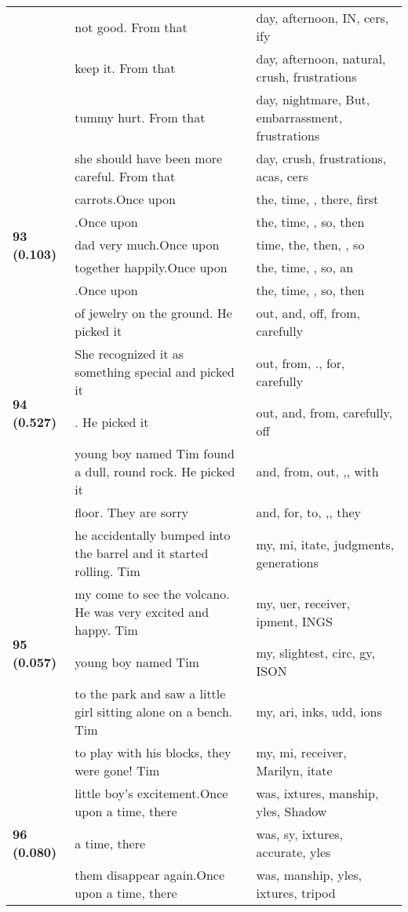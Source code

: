 \documentclass{article}
\begin{document}
\begin{adjustbox}{max width=\textwidth}
\begin{tabular}{p{} p{} p{}}
 & not good. From that & day,  afternoon, IN, cers, ify \\
 & keep it. From that & day,  afternoon,  natural,  crush,  frustrations \\
 & tummy hurt. From that & day,  nightmare, But,  embarrassment,  frustrations \\
 & she should have been more careful. From that & day,  crush,  frustrations, acas, cers \\
\midrule
\multirow{5}{*}{\textbf{93 (0.103)}} & carrots.Once upon & the,  time,  ,  there,  first \\
 & .Once upon & the,  time,  ,  so,  then \\
 & dad very much.Once upon & time,  the,  then,  ,  so \\
 & together happily.Once upon & the,  time,  ,  so,  an \\
 & .Once upon & the,  time,  ,  so,  then \\
\midrule
\multirow{5}{*}{\textbf{94 (0.527)}} & of jewelry on the ground. He picked it & out,  and,  off,  from,  carefully \\
 & She recognized it as something special and picked it & out,  from, .,  for,  carefully \\
 & . He picked it & out,  and,  from,  carefully,  off \\
 & young boy named Tim found a dull, round rock. He picked it & and,  from,  out, ,,  with \\
 & floor. They are sorry & and,  for,  to, ,,  they \\
\midrule
\multirow{5}{*}{\textbf{95 (0.057)}} & he accidentally bumped into the barrel and it started rolling. Tim & my, mi, itate,  judgments,  generations \\
 & my come to see the volcano. He was very excited and happy. Tim & my, uer,  receiver, ipment, INGS \\
 & young boy named Tim & my,  slightest,  circ,  gy, ISON \\
 & to the park and saw a little girl sitting alone on a bench. Tim & my, ari, inks, udd, ions \\
 & to play with his blocks, they were gone! Tim & my, mi,  receiver,  Marilyn, itate \\
\midrule
\multirow{5}{*}{\textbf{96 (0.080)}} & little boy's excitement.Once upon a time, there & was, ixtures, manship, yles, Shadow \\
 & a time, there & was, sy, ixtures,  accurate, yles \\
 & them disappear again.Once upon a time, there & was, manship, yles, ixtures,  tripod \\

\end{tabular}
\end{adjustbox}
\end{document}
